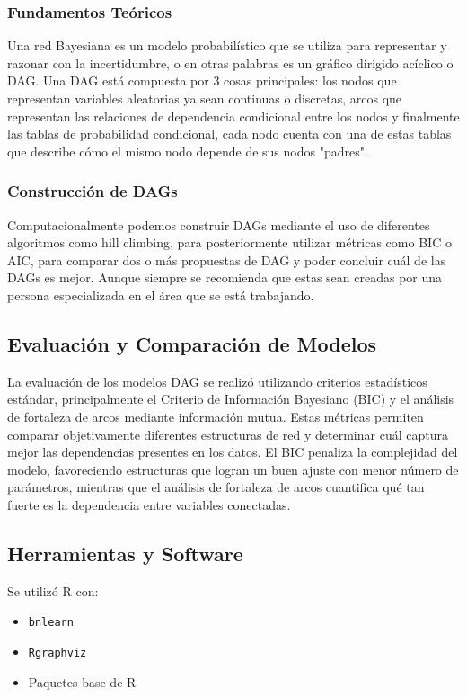 \documentclass[12pt,a4paper]{article}
\begin{document}
\subsubsection{Fundamentos Teóricos}

Una red Bayesiana es un modelo probabilístico que se utiliza para representar y razonar con la incertidumbre, o en otras palabras es un gráfico dirigido acíclico o DAG. Una DAG está compuesta por 3 cosas principales: los nodos que representan variables aleatorias ya sean continuas o discretas, arcos que representan las relaciones de dependencia condicional entre los nodos y finalmente las tablas de probabilidad condicional, cada nodo cuenta con una de estas tablas que describe cómo el mismo nodo depende de sus nodos "padres".

\subsubsection{Construcción de DAGs}

Computacionalmente podemos construir DAGs mediante el uso de diferentes algoritmos como hill climbing, para posteriormente utilizar métricas como BIC o AIC, para comparar dos o más propuestas de DAG y poder concluir cuál de las DAGs es mejor. Aunque siempre se recomienda que estas sean creadas por una persona especializada en el área que se está trabajando.


\subsection{Evaluación y Comparación de Modelos}

La evaluación de los modelos DAG se realizó utilizando criterios estadísticos estándar, principalmente el Criterio de Información Bayesiano (BIC) y el análisis de fortaleza de arcos mediante información mutua. Estas métricas permiten comparar objetivamente diferentes estructuras de red y determinar cuál captura mejor las dependencias presentes en los datos. El BIC penaliza la complejidad del modelo, favoreciendo estructuras que logran un buen ajuste con menor número de parámetros, mientras que el análisis de fortaleza de arcos cuantifica qué tan fuerte es la dependencia entre variables conectadas.


\subsection{Herramientas y Software}

Se utilizó R con:
\begin{itemize}
    \item \texttt{bnlearn}
    \item \texttt{Rgraphviz}
    \item Paquetes base de R
\end{itemize}
\end{document}

